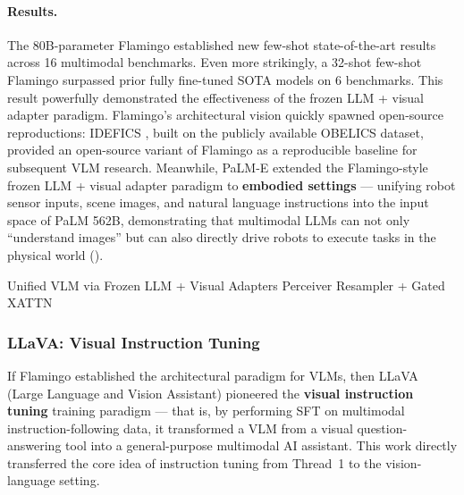 \paragraph{Results.}
The 80B-parameter Flamingo established new few-shot state-of-the-art results across 16 multimodal benchmarks.
Even more strikingly, a 32-shot few-shot Flamingo surpassed prior fully fine-tuned SOTA models on 6 benchmarks.
This result powerfully demonstrated the effectiveness of the frozen LLM + visual adapter paradigm.
Flamingo's architectural vision quickly spawned open-source reproductions:
IDEFICS \cite{laurencon2023idefics}, built on the publicly available OBELICS dataset,
provided an open-source variant of Flamingo as a reproducible baseline for subsequent VLM research.
Meanwhile, PaLM-E \cite{driess2023palme} extended the Flamingo-style frozen LLM + visual adapter paradigm
to \textbf{embodied settings} --- unifying robot sensor inputs, scene images, and natural language instructions
into the input space of PaLM 562B,
demonstrating that multimodal LLMs can not only ``understand images'' but can also directly drive robots to execute tasks in the physical world
().

  {Unified VLM via Frozen LLM + Visual Adapters}
  {Perceiver Resampler + Gated XATTN}

\subsubsection{LLaVA: Visual Instruction Tuning}
\label{sec:t5-llava}

If Flamingo established the architectural paradigm for VLMs,
then LLaVA (Large Language and Vision Assistant) \cite{liu2023llava} pioneered
the \textbf{visual instruction tuning} training paradigm ---
that is, by performing SFT on multimodal instruction-following data,
it transformed a VLM from a visual question-answering tool into a general-purpose multimodal AI assistant.
This work directly transferred the core idea of instruction tuning from Thread~1
to the vision-language setting.

